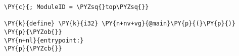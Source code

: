 \begin{Verbatim}[commandchars=\\\{\}]
\PY{c}{; ModuleID = \PYZsq{}top\PYZsq{}}

\PY{k}{define} \PY{k}{i32} \PY{n+nv+vg}{@main}\PY{p}{(}\PY{p}{)} \PY{p}{\PYZob{}}
\PY{n+nl}{entrypoint:}
\PY{p}{\PYZcb{}}
\end{Verbatim}
